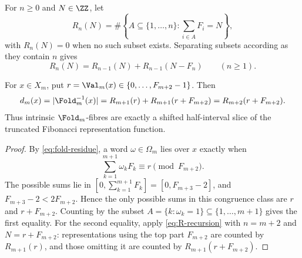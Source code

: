 For \(n\ge0\) and \(N\in\ZZ\), let
\[
  R_n(N)=\#\left\{A\subseteq\{1,\ldots,n\}:
  \sum_{i\in A}F_i=N\right\},
\]
with \(R_n(N)=0\) when no such subset exists.  Separating subsets according as
they contain \(n\) gives
\begin{equation}\label{eq:R-recursion}
  R_n(N)=R_{n-1}(N)+R_{n-1}(N-F_n)
  \qquad(n\ge1).
\end{equation}

\begin{lemma}
\label{lem:fold-fibre-representation-pairing}
For \(x\in X_m\), put \(r=\Val_m(x)\in\{0,\ldots,F_{m+2}-1\}\).  Then
\[
  d_m(x)=|\Fold_m^{-1}(x)|
  =R_{m+1}(r)+R_{m+1}(r+F_{m+2})
  =R_{m+2}(r+F_{m+2}).
\]
Thus intrinsic \(\Fold_m\)-fibres are exactly a shifted half-interval slice of
the truncated Fibonacci representation function.
\end{lemma}

\begin{proof}
By \eqref{eq:fold-residue}, a word \(\omega\in\Omega_m\) lies over \(x\) exactly
when
\[
  \sum_{k=1}^{m+1}\omega_kF_k\equiv r\pmod {F_{m+2}} .
\]
The possible sums lie in
\([0,\sum_{k=1}^{m+1}F_k]=[0,F_{m+3}-2]\), and
\(F_{m+3}-2<2F_{m+2}\).  Hence the only possible sums in this congruence class
are \(r\) and \(r+F_{m+2}\).  Counting by the subset
\(A=\{k:\omega_k=1\}\subseteq\{1,\ldots,m+1\}\) gives the first equality.
For the second equality, apply \eqref{eq:R-recursion} with
\(n=m+2\) and \(N=r+F_{m+2}\): representations using the top part
\(F_{m+2}\) are counted by \(R_{m+1}(r)\), and those omitting it are counted by
\(R_{m+1}(r+F_{m+2})\).
\end{proof}


